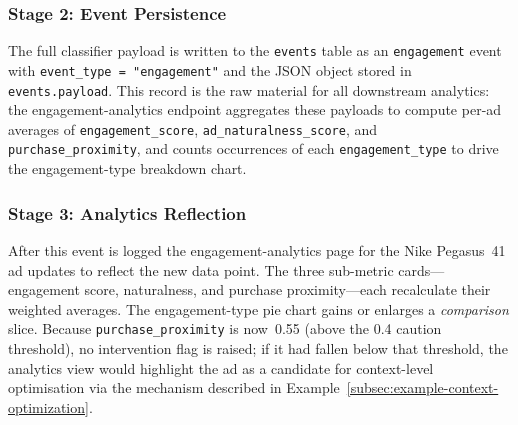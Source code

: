 \subsubsection{Stage 2: Event Persistence}
\label{subsubsec:example4-persistence}

The full classifier payload is written to the \texttt{events} table as an
\texttt{engagement} event with \texttt{event\_type = "engagement"} and the JSON
object stored in \texttt{events.payload}.  This record is the raw material for
all downstream analytics: the engagement-analytics endpoint aggregates these
payloads to compute per-ad averages of \texttt{engagement\_score},
\texttt{ad\_naturalness\_score}, and \texttt{purchase\_proximity}, and counts
occurrences of each \texttt{engagement\_type} to drive the engagement-type
breakdown chart.

\subsubsection{Stage 3: Analytics Reflection}
\label{subsubsec:example4-analytics}

After this event is logged the engagement-analytics page for the Nike
Pegasus~41 ad updates to reflect the new data point.  The three sub-metric
cards---engagement score, naturalness, and purchase proximity---each recalculate
their weighted averages.  The engagement-type pie chart gains or enlarges a
\emph{comparison} slice.  Because \texttt{purchase\_proximity} is now~0.55 (above
the 0.4 caution threshold), no intervention flag is raised; if it had fallen
below that threshold, the analytics view would highlight the ad as a candidate
for context-level optimisation via the mechanism described in
Example~\ref{subsec:example-context-optimization}.
